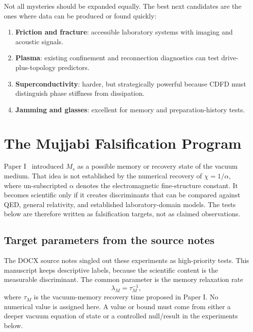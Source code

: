 \documentclass[11pt]{article}
\begin{document}
Not all mysteries should be expanded equally. The best next candidates are the ones where data can be produced or found quickly:
\begin{enumerate}
    \item \textbf{Friction and fracture}: accessible laboratory systems with imaging and acoustic signals.
    \item \textbf{Plasma}: existing confinement and reconnection diagnostics can test drive-plus-topology predictors.
    \item \textbf{Superconductivity}: harder, but strategically powerful because CDFD must distinguish phase stiffness from dissipation.
    \item \textbf{Jamming and glasses}: excellent for memory and preparation-history tests.
\end{enumerate}

\section{The Mujjabi Falsification Program}

Paper I~\cite{MujjabiI2026} introduced $M_s$ as a possible memory or recovery state of the vacuum
medium. That idea is not established by the numerical recovery of
$\chi=1/\alpha$, where un-subscripted $\alpha$ denotes the electromagnetic
fine-structure constant. It becomes scientific only if it creates discriminants that can
be compared against QED, general relativity, and established laboratory-domain
models. The tests below are therefore written as falsification targets, not as
claimed observations.

\subsection{Target parameters from the source notes}

The DOCX source notes singled out these experiments as high-priority tests. This
manuscript keeps descriptive labels, because the scientific content is the
measurable discriminant. The common parameter is the memory relaxation rate
\begin{equation}
    \lambda_M=\tau_M^{-1},
\end{equation}
where $\tau_M$ is the vacuum-memory recovery time proposed in Paper I. No
numerical value is assigned here. A value or bound must come from either a deeper
vacuum equation of state or a controlled null/result in the experiments below.
\end{document}
